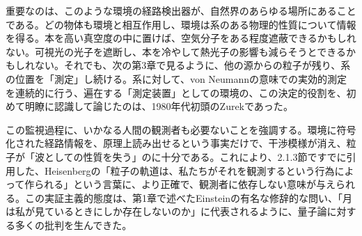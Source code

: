 重要なのは、このような環境の経路検出器が、自然界のあらゆる場所にあることである。どの物体も環境と相互作用し、環境は系のある物理的性質について情報を得る。本を高い真空度の中に置けば、空気分子をある程度遮蔽できるかもしれない。可視光の光子を遮断し、本を冷やして熱光子の影響も減らそうとできるかもしれない。それでも、次の第3章で見るように、他の源からの粒子が残り、系の位置を「測定」し続ける。系に対して、von Neumannの意味での実効的測定を連続的に行う、遍在する「測定装置」としての環境の、この決定的役割を、初めて明瞭に認識して論じたのは、1980年代初頭のZurekであった\cite{ref008,ref076}。

\hypertarget{srcpage:67}{}\label{srcpage:67}
この監視過程に、いかなる人間の観測者も必要ないことを強調する。環境に符号化された経路情報を、原理上読み出せるという事実だけで、干渉模様が消え、粒子が「波としての性質を失う」のに十分である。これにより、2.1.3節ですでに引用した、Heisenbergの「粒子の軌道は、私たちがそれを観測するという行為によって作られる」\cite[p.~185]{ref042}という言葉に、より正確で、観測者に依存しない意味が与えられる。この実証主義的態度は、第1章で述べたEinsteinの有名な修辞的な問い、「月は私が見ているときにしか存在しないのか」\cite{ref003}に代表されるように、量子論に対する多くの批判を生んできた。

